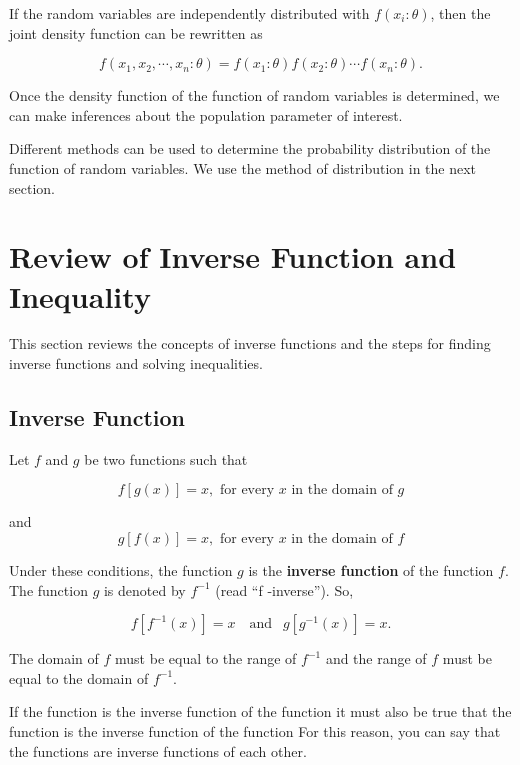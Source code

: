 \documentclass[
]{book}
\begin{document}
If the random variables are independently distributed with \(f(x_i:\theta)\), then the joint density function can be rewritten as

\[
f(x_1, x_2, \cdots, x_n: \theta) = f(x_1:\theta)f(x_2:\theta)\cdots f(x_n:\theta).
\]

Once the density function of the function of random variables is determined, we can make inferences about the population parameter of interest.

Different methods can be used to determine the probability distribution of the function of random variables. We use the method of distribution in the next section.

\hfill\break

\hypertarget{review-of-inverse-function-and-inequality}{%
\section{Review of Inverse Function and Inequality}\label{review-of-inverse-function-and-inequality}}

This section reviews the concepts of inverse functions and the steps for finding inverse functions and solving inequalities.

\hypertarget{inverse-function-1}{%
\subsection{Inverse Function}\label{inverse-function-1}}

Let \(f\) and \(g\) be two functions such that

\[
f[g(x)] = x, \text{ for every $x$ in the domain of $g$}
\]

and
\[
g[f(x)] = x, \text{ for every $x$ in the domain of $f$}
\]

Under these conditions, the function \(g\) is the \textbf{inverse function} of the function \(f\). The function \(g\) is denoted by \(f^{-1}\) (read ``f -inverse''). So,

\[
f[f^{-1}(x)] = x \ \ \ \text{ and } \ \ g[g^{-1}(x)] = x.
\]

The domain of \(f\) must be equal to the range of \(f^{-1}\) and the range of \(f\) must be equal to the domain of \(f^{-1}\).

If the function is the inverse function of the function it must also be true that the function is the inverse function of the function For this reason, you can say that the functions are inverse functions of each other.
\end{document}
